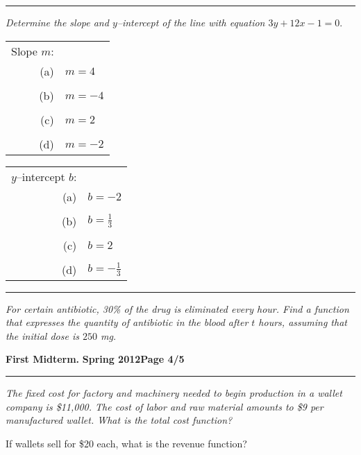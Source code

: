 \documentclass[12pt]{article}
\begin{document}
\vspace{2cm}
\hrule
{\problem[10 pts] \em Determine the slope and $y$--intercept of the
  line with equation $3y+12x-1=0.$}
\begin{tabular}{rl}
Slope $m$: \\
(a) & $m=4$ \\ \\
(b) & $m=-4$ \\ \\
(c) &$m=2$ \\ \\
(d) &$m=-2$
\end{tabular} \hspace{3cm}
\begin{tabular}{rl}
$y$--intercept $b$: \\
(a) & $b=-2$ \\ \\
(b) &$b=\tfrac{1}{3}$ \\ \\
(c) &$b=2$ \\ \\
(d) &$b=-\tfrac{1}{3}$
\end{tabular}
\vspace{3.5cm}
\hrule
{\problem[10 pts] \em For certain antibiotic, 30\% of the drug is
  eliminated every hour.  Find a function that expresses the quantity
  of antibiotic in the blood after $t$ hours, assuming that the
  initial dose is $250$ mg.}
\vspace{3.5cm}
\begin{flushright}
\end{flushright}
\newpage

\hfill{\large\bf First Midterm.}\hfill{\large\bf
  Spring 2012}\hfill{\large\bf Page 4/5}\hrule

\bigskip
{\problem[15 pts] \em The fixed cost for factory and machinery needed
  to begin production in a wallet company is \$11,000.  The cost of
  labor and raw material amounts to \$9 per manufactured wallet.
  What is the total cost function?}
\vspace{1cm}

\begin{flushright}
\end{flushright}
\noindent
If wallets sell for \$20 each, what is the revenue function?
\vspace{1cm}
\end{document}
